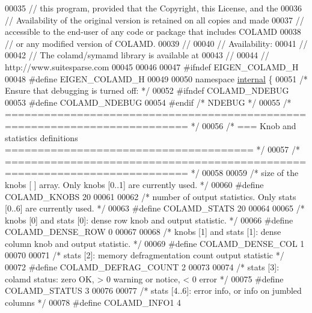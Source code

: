 \begin{DoxyCode}
00035 \textcolor{comment}{//   this program, provided that the Copyright, this License, and the}
00036 \textcolor{comment}{//   Availability of the original version is retained on all copies and made}
00037 \textcolor{comment}{//   accessible to the end-user of any code or package that includes COLAMD}
00038 \textcolor{comment}{//   or any modified version of COLAMD. }
00039 \textcolor{comment}{// }
00040 \textcolor{comment}{//     Availability:}
00041 \textcolor{comment}{// }
00042 \textcolor{comment}{//   The colamd/symamd library is available at}
00043 \textcolor{comment}{// }
00044 \textcolor{comment}{//       http://www.suitesparse.com}
00045 
00046   
00047 \textcolor{preprocessor}{#ifndef EIGEN\_COLAMD\_H}
00048 \textcolor{preprocessor}{#define EIGEN\_COLAMD\_H}
00049 
00050 \textcolor{keyword}{namespace }\hyperlink{namespaceinternal}{internal} \{
00051 \textcolor{comment}{/* Ensure that debugging is turned off: */}
00052 \textcolor{preprocessor}{#ifndef COLAMD\_NDEBUG}
00053 \textcolor{preprocessor}{#define COLAMD\_NDEBUG}
00054 \textcolor{preprocessor}{#endif }\textcolor{comment}{/* NDEBUG */}\textcolor{preprocessor}{}
00055 \textcolor{comment}{/* ========================================================================== */}
00056 \textcolor{comment}{/* === Knob and statistics definitions ====================================== */}
00057 \textcolor{comment}{/* ========================================================================== */}
00058 
00059 \textcolor{comment}{/* size of the knobs [ ] array.  Only knobs [0..1] are currently used. */}
00060 \textcolor{preprocessor}{#define COLAMD\_KNOBS 20}
00061 
00062 \textcolor{comment}{/* number of output statistics.  Only stats [0..6] are currently used. */}
00063 \textcolor{preprocessor}{#define COLAMD\_STATS 20 }
00064 
00065 \textcolor{comment}{/* knobs [0] and stats [0]: dense row knob and output statistic. */}
00066 \textcolor{preprocessor}{#define COLAMD\_DENSE\_ROW 0}
00067 
00068 \textcolor{comment}{/* knobs [1] and stats [1]: dense column knob and output statistic. */}
00069 \textcolor{preprocessor}{#define COLAMD\_DENSE\_COL 1}
00070 
00071 \textcolor{comment}{/* stats [2]: memory defragmentation count output statistic */}
00072 \textcolor{preprocessor}{#define COLAMD\_DEFRAG\_COUNT 2}
00073 
00074 \textcolor{comment}{/* stats [3]: colamd status:  zero OK, > 0 warning or notice, < 0 error */}
00075 \textcolor{preprocessor}{#define COLAMD\_STATUS 3}
00076 
00077 \textcolor{comment}{/* stats [4..6]: error info, or info on jumbled columns */} 
00078 \textcolor{preprocessor}{#define COLAMD\_INFO1 4}

\end{DoxyCode}
